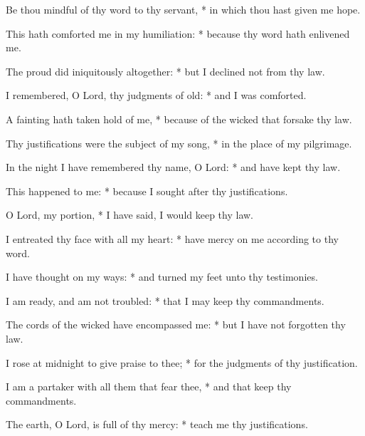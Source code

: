 \item Be thou mindful of thy word to thy servant, * in which thou hast given me hope.
\item This hath comforted me in my humiliation: * because thy word hath enlivened me.
\item The proud did iniquitously altogether: * but I declined not from thy law.
\item I remembered, O Lord, thy judgments of old: * and I was comforted.
\item A fainting hath taken hold of me, * because of the wicked that forsake thy law.
\item Thy justifications were the subject of my song, * in the place of my pilgrimage.
\item In the night I have remembered thy name, O Lord: * and have kept thy law.
\item This happened to me: * because I sought after thy justifications.
\item O Lord, my portion, * I have said, I would keep thy law.
\item I entreated thy face with all my heart: * have mercy on me according to thy word.
\item I have thought on my ways: * and turned my feet unto thy testimonies.
\item I am ready, and am not troubled: * that I may keep thy commandments.
\item The cords of the wicked have encompassed me: * but I have not forgotten thy law.
\item I rose at midnight to give praise to thee; * for the judgments of thy justification.
\item I am a partaker with all them that fear thee, * and that keep thy commandments.
\item The earth, O Lord, is full of thy mercy: * teach me thy justifications.
